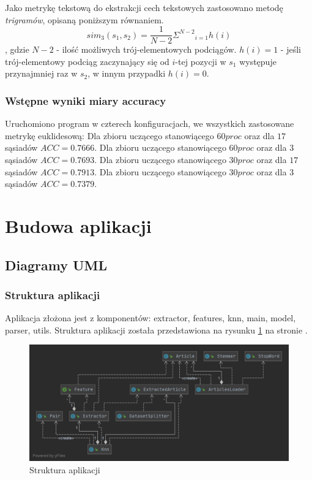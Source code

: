 \documentclass{classrep}
\begin{document}
Jako metrykę tekstową do ekstrakcji cech tekstowych zastosowano metodę \textit{trigramów}, opisaną poniższym równaniem.
\begin{equation}
sim_{3}(s_1,s_2) = \frac{1}{N-2} {{\Sigma}^{N-2}}_{i=1} h(i)\label{eq:eps}
\end{equation}
\newline , gdzie
\newline $N-2$ - ilość możliwych trój-elementowych podciągów.
\newline $h(i) = 1$ - jeśli trój-elementowy podciąg zaczynający się od $i$-tej pozycji w $s_1$ występuje przynajmniej raz w $s_2$, w innym przypadki $h(i)=0$.

\subsubsection{Wstępne wyniki miary accuracy}
Uruchomiono program w czterech konfiguracjach, we wszystkich zastosowane metrykę euklidesową:
\newline Dla zbioru uczącego stanowiącego $60 proc$ oraz dla $17$ sąsiadów $ACC=0.7666$.
\newline Dla zbioru uczącego stanowiącego $60 proc$ oraz dla $3$ sąsiadów $ACC=0.7693$.
\newline Dla zbioru uczącego stanowiącego $30 proc$ oraz dla $17$ sąsiadów $ACC=0.7913$.
\newline Dla zbioru uczącego stanowiącego $30 proc$ oraz dla $3$ sąsiadów $ACC=0.7379$.



\section{Budowa aplikacji}
\subsection{Diagramy UML}

\subsubsection{Struktura aplikacji}
Aplikacja złożona jest z komponentów: extractor, features, knn, main, model, parser, utils. Struktura aplikacji została przedstawiona na rysunku \ref{app} na stronie \pageref{app}.

\begin{figure}[H]
\label{app}
\includegraphics[scale=0.35]{App structure}
\caption{Struktura aplikacji}
\end{figure}
\end{document}
